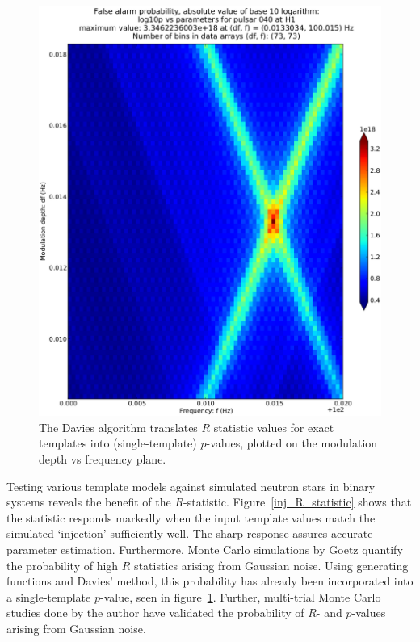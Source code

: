 \begin{figure}
\begin{center}
\includegraphics[trim=20 20 20 5, clip, width=0.8\paperwidth,height=0.62\paperheight]{Prob-4e21-on-4e24.eps}
\caption{The Davies algorithm translates $R$ statistic values for exact templates into (single-template) $p$-values, plotted on the modulation depth vs frequency plane.}
\label{inj_log10p}
\end{center}
\end{figure}

Testing various template models against simulated neutron stars in binary systems reveals the benefit of the $R$-statistic.
Figure~\ref{inj_R_statistic} shows that the statistic responds markedly when the input template values match the simulated `injection' sufficiently well.
The sharp response assures accurate parameter estimation.
Furthermore, Monte Carlo simulations by Goetz quantify the probability of high $R$ statistics arising from Gaussian noise.
Using generating functions and Davies' method, this probability has already been incorporated into a single-template $p$-value, seen in figure~\ref{inj_log10p}.
Further, multi-trial Monte Carlo studies done by the author have validated the probability of $R$- and $p$-values arising from Gaussian noise.


